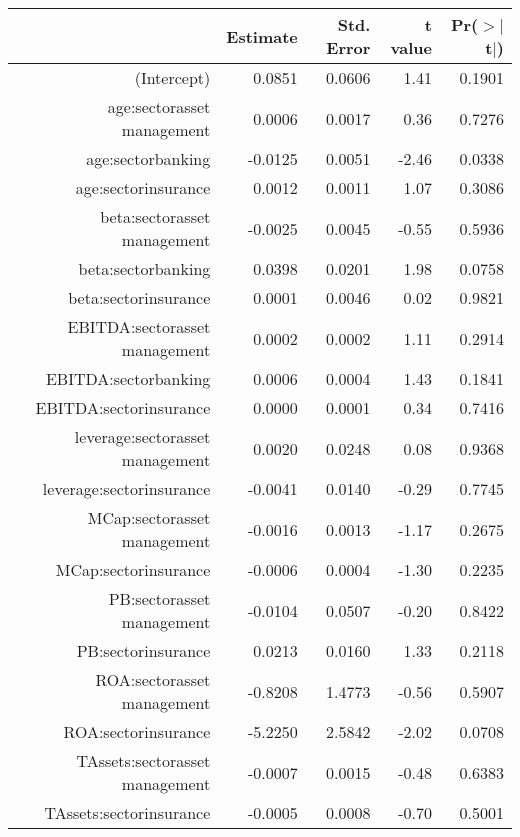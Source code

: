 \begin{table}[ht]
\centering
\begin{tabular}{rrrrr}
  \hline
 & Estimate & Std. Error & t value & Pr($>$$|$t$|$) \\ 
  \hline
(Intercept) & 0.0851 & 0.0606 & 1.41 & 0.1901 \\ 
  age:sectorasset management & 0.0006 & 0.0017 & 0.36 & 0.7276 \\ 
  age:sectorbanking & -0.0125 & 0.0051 & -2.46 & 0.0338 \\ 
  age:sectorinsurance & 0.0012 & 0.0011 & 1.07 & 0.3086 \\ 
  beta:sectorasset management & -0.0025 & 0.0045 & -0.55 & 0.5936 \\ 
  beta:sectorbanking & 0.0398 & 0.0201 & 1.98 & 0.0758 \\ 
  beta:sectorinsurance & 0.0001 & 0.0046 & 0.02 & 0.9821 \\ 
  EBITDA:sectorasset management & 0.0002 & 0.0002 & 1.11 & 0.2914 \\ 
  EBITDA:sectorbanking & 0.0006 & 0.0004 & 1.43 & 0.1841 \\ 
  EBITDA:sectorinsurance & 0.0000 & 0.0001 & 0.34 & 0.7416 \\ 
  leverage:sectorasset management & 0.0020 & 0.0248 & 0.08 & 0.9368 \\ 
  leverage:sectorinsurance & -0.0041 & 0.0140 & -0.29 & 0.7745 \\ 
  MCap:sectorasset management & -0.0016 & 0.0013 & -1.17 & 0.2675 \\ 
  MCap:sectorinsurance & -0.0006 & 0.0004 & -1.30 & 0.2235 \\ 
  PB:sectorasset management & -0.0104 & 0.0507 & -0.20 & 0.8422 \\ 
  PB:sectorinsurance & 0.0213 & 0.0160 & 1.33 & 0.2118 \\ 
  ROA:sectorasset management & -0.8208 & 1.4773 & -0.56 & 0.5907 \\ 
  ROA:sectorinsurance & -5.2250 & 2.5842 & -2.02 & 0.0708 \\ 
  TAssets:sectorasset management & -0.0007 & 0.0015 & -0.48 & 0.6383 \\ 
  TAssets:sectorinsurance & -0.0005 & 0.0008 & -0.70 & 0.5001 \\ 
   \hline
\end{tabular}
\end{table}
